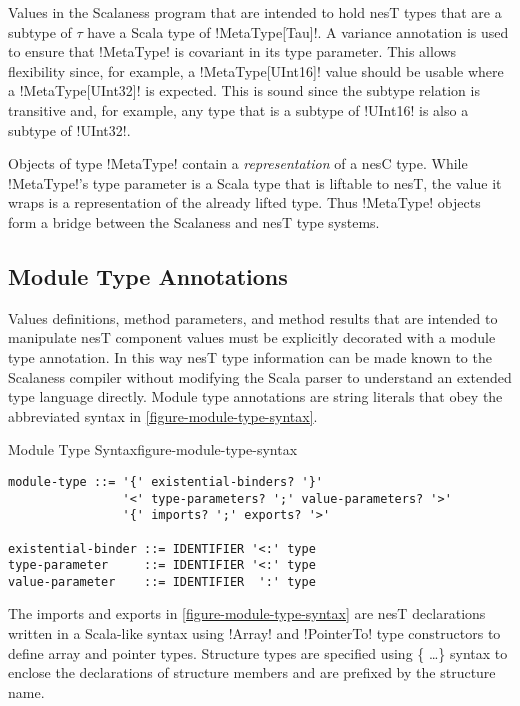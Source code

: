 Values in the Scalaness program that are intended to hold nesT types that are a subtype of
$\tau$ have a Scala type of !MetaType[Tau]!. A variance annotation is used to ensure that
!MetaType! is covariant in its type parameter. This allows flexibility since, for example, a
!MetaType[UInt16]! value should be usable where a !MetaType[UInt32]! is expected. This is sound
since the subtype relation is transitive and, for example, any type that is a subtype of
!UInt16! is also a subtype of !UInt32!.

Objects of type !MetaType! contain a \emph{representation} of a nesC type. While !MetaType!'s
type parameter is a Scala type that is liftable to nesT, the value it wraps is a representation
of the already lifted type. Thus !MetaType! objects form a bridge between the Scalaness and nesT
type systems.


\subsection{Module Type Annotations}
\label{section-module-type}

Values definitions, method parameters, and method results that are intended to manipulate nesT
component values must be explicitly decorated with a module type annotation. In this way nesT
type information can be made known to the Scalaness compiler without modifying the Scala parser
to understand an extended type language directly. Module type annotations are string literals
that obey the abbreviated syntax in \autoref{figure-module-type-syntax}.

\singlespace
\begin{fpfig}[tbhp]{Module Type Syntax}{figure-module-type-syntax}
{
\begin{Verbatim}
module-type ::= '{' existential-binders? '}'
                '<' type-parameters? ';' value-parameters? '>'
                '{' imports? ';' exports? '>'

existential-binder ::= IDENTIFIER '<:' type
type-parameter     ::= IDENTIFIER '<:' type
value-parameter    ::= IDENTIFIER  ':' type
\end{Verbatim}
}
\end{fpfig}
\primaryspacing

The imports and exports in \autoref{figure-module-type-syntax} are nesT declarations written in
a Scala-like syntax using !Array! and !PointerTo! type constructors to define array and pointer
types. Structure types are specified using \{ \ldots \} syntax to enclose the declarations of
structure members and are prefixed by the structure name.

